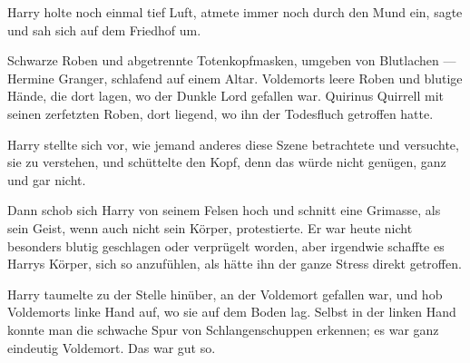 Harry holte noch einmal tief Luft, atmete immer noch durch den Mund ein, sagte  und sah sich auf dem Friedhof um.





Schwarze Roben und abgetrennte Totenkopfmasken, umgeben von Blutlachen —
Hermine Granger, schlafend auf einem Altar.
Voldemorts leere Roben und blutige Hände, die dort lagen, wo der Dunkle Lord gefallen war.
Quirinus Quirrell mit seinen zerfetzten Roben, dort liegend, wo ihn der Todesfluch getroffen hatte.

Harry stellte sich vor, wie jemand anderes diese Szene betrachtete und versuchte, sie zu verstehen, und schüttelte den Kopf, denn das würde nicht genügen, ganz und gar nicht.

Dann schob sich Harry von seinem Felsen hoch und schnitt eine Grimasse, als sein Geist, wenn auch nicht sein Körper, protestierte. Er war heute nicht besonders blutig geschlagen oder verprügelt worden, aber irgendwie schaffte es Harrys Körper, sich so anzufühlen, als hätte ihn der ganze Stress direkt getroffen.

Harry taumelte zu der Stelle hinüber, an der Voldemort gefallen war, und hob Voldemorts linke Hand auf, wo sie auf dem Boden lag.
Selbst in der linken Hand konnte man die schwache Spur von Schlangenschuppen erkennen; es war ganz eindeutig Voldemort. Das war gut so.

